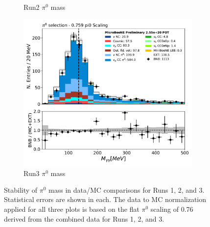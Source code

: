 \documentclass[a4paper]{article}
\begin{document}
\begin{figure}[H]
\begin{center}
\begin{subfigure}[b]{0.3\textwidth}
    \caption{\label{fig:stability:pi0mass:R2} Run2 $\pi^0$ mass}
    \end{subfigure}
    \begin{subfigure}[b]{0.3\textwidth}
    \centering
    \includegraphics[width=1.00\textwidth]{stability/pi0_mass_Y_corrpi0_mass_Y_corr_run3.pdf}
    \caption{\label{fig:stability:pi0mass:R3} Run3 $\pi^0$ mass}
    \end{subfigure}
\caption{\label{fig:stability:pi0mass}Stability of $\pi^0$ mass in data/MC comparisons for Runs 1, 2, and 3. Statistical errors are shown in each. The data to MC normalization applied for all three plots is based on the flat $\pi^0$ scaling of 0.76 derived from the combined data for Runs 1, 2, and 3.}
\end{center}
\end{figure}
\end{document}
